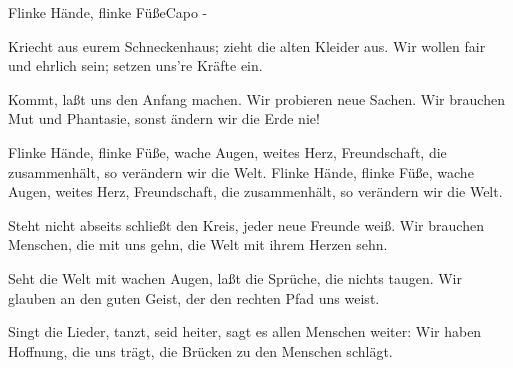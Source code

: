 \begin{song}{Flinke Hände, flinke Füße}{}{Capo -}

Kriecht aus eurem Schneckenhaus;  zieht die alten Kleider aus.
Wir wollen fair und ehrlich sein; setzen uns're   Kräfte ein.

Kommt, laßt uns den Anfang machen. Wir probieren neue Sachen.
Wir brauchen Mut und Phantasie, sonst ändern wir die Erde nie!

Flinke Hände, flinke Füße, wache Augen, weites Herz,
Freundschaft, die zusammenhält, so verändern wir die Welt.
Flinke Hände, flinke Füße, wache Augen, weites Herz,
Freundschaft, die zusammenhält, so verändern wir die Welt.

Steht nicht abseits schließt den Kreis,      jeder neue     Freunde weiß.
Wir brauchen Menschen, die mit uns gehn, die Welt mit ihrem Herzen sehn.

  

Seht die Welt mit wachen Augen, laßt die Sprüche, die nichts taugen.
Wir glauben an den guten Geist, der den rechten   Pfad uns weist.

 

Singt die Lieder, tanzt, seid heiter,  sagt es allen  Menschen weiter:
Wir haben Hoffnung, die uns trägt, die Brücken zu den Menschen schlägt.

 
\end{song}